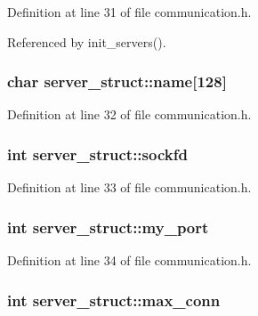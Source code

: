Definition at line 31 of file communication.h.

Referenced by init\_\-servers().\hypertarget{structserver__struct_a50388c012354da44c2f85cf0492b932}{
\subsubsection{\setlength{\rightskip}{0pt plus 5cm}char {\bf server\_\-struct::name}\mbox{[}128\mbox{]}}}
\label{structserver__struct_a50388c012354da44c2f85cf0492b932}




Definition at line 32 of file communication.h.\hypertarget{structserver__struct_17659ebbdd1f18203ed0ead7ca1b5ed1}{
\subsubsection{\setlength{\rightskip}{0pt plus 5cm}int {\bf server\_\-struct::sockfd}}}
\label{structserver__struct_17659ebbdd1f18203ed0ead7ca1b5ed1}




Definition at line 33 of file communication.h.\hypertarget{structserver__struct_cfe32222ef17a379eb0d1979811e2ddb}{
\subsubsection{\setlength{\rightskip}{0pt plus 5cm}int {\bf server\_\-struct::my\_\-port}}}
\label{structserver__struct_cfe32222ef17a379eb0d1979811e2ddb}




Definition at line 34 of file communication.h.\hypertarget{structserver__struct_8aa422f50ae575556a51e282277c79e7}{
\subsubsection{\setlength{\rightskip}{0pt plus 5cm}int {\bf server\_\-struct::max\_\-conn}}}
\label{structserver__struct_8aa422f50ae575556a51e282277c79e7}




